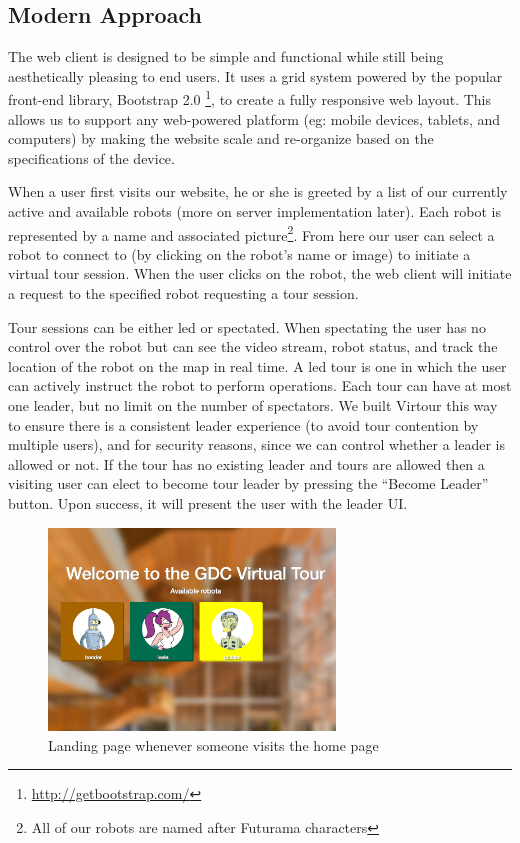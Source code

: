 \documentclass[
  oneside,
  11pt, a4paper,
  footinclude=true,
  headinclude=true,
  cleardoublepage=empty
]{article}
\begin{document}
\subsection{Modern Approach}

The web client is designed to be simple and functional while still being
aesthetically pleasing to end users. It uses a grid system powered by the
popular front-end library, Bootstrap 2.0
\footnote{\url{http://getbootstrap.com/}}, to create a fully
responsive web layout. This allows us to support any web-powered platform (eg:
mobile devices, tablets, and computers) by making the website scale and
re-organize based on the specifications of the device.

When a user first visits our website, he or she is greeted by a list of our
currently active and available robots (more on server implementation later).
Each robot is represented by a name and associated picture\footnote{All of our
robots are named after Futurama characters}. From here our user can select a
robot to connect to (by clicking on the robot's name or image) to initiate a
virtual tour session. When the user clicks on the robot, the web client will
initiate a request to the specified robot requesting a tour session.

Tour sessions can be either led or spectated. When spectating the user has no
control over the robot but can see the video stream, robot status, and track
the location of the robot on the map in real time. A led tour is one in
which the user can actively instruct the robot to perform operations. Each tour
can have at most one leader, but no limit on the number of spectators. We built
Virtour this way to ensure there is a consistent leader experience (to avoid tour
contention by multiple users), and for security reasons, since we can control
whether a leader is allowed or not. If the tour has no existing leader and
tours are allowed then a visiting user can elect to become tour leader by
pressing the ``Become Leader'' button. Upon success, it will present the user
with the leader UI.

\begin{figure}
\centering
\includegraphics[width=3in]{tour_homepage}
\caption{Landing page whenever someone visits the home page}
\end{figure}
\end{document}
